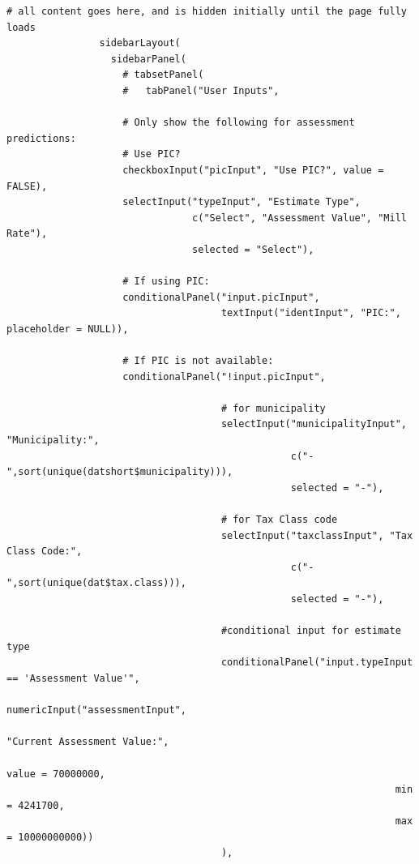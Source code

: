 \documentclass{article}
\begin{document}
\begin{lstlisting}[style=R, caption={Code used for the Shiny app.}, captionpos=b]
                # all content goes here, and is hidden initially until the page fully loads
                sidebarLayout(
                  sidebarPanel(
                    # tabsetPanel(
                    #   tabPanel("User Inputs",        
                    
                    # Only show the following for assessment predictions:
                    # Use PIC?
                    checkboxInput("picInput", "Use PIC?", value = FALSE),
                    selectInput("typeInput", "Estimate Type",
                                c("Select", "Assessment Value", "Mill Rate"),
                                selected = "Select"),
                                     
                    # If using PIC:
                    conditionalPanel("input.picInput",
                                     textInput("identInput", "PIC:", placeholder = NULL)),
                                     
                    # If PIC is not available:
                    conditionalPanel("!input.picInput",
                                     
                                     # for municipality
                                     selectInput("municipalityInput", "Municipality:", 
                                                 c("-",sort(unique(datshort$municipality))),
                                                 selected = "-"),
                                                     
                                     # for Tax Class code
                                     selectInput("taxclassInput", "Tax Class Code:",
                                                 c("-",sort(unique(dat$tax.class))),
                                                 selected = "-"),
                                     
                                     #conditional input for estimate type
                                     conditionalPanel("input.typeInput == 'Assessment Value'",
                                                      numericInput("assessmentInput",
                                                                   "Current Assessment Value:",
                                                                   value = 70000000, 
                                                                   min = 4241700, 
                                                                   max = 10000000000))
                                     ),
                                    

\end{lstlisting}
\end{document}
